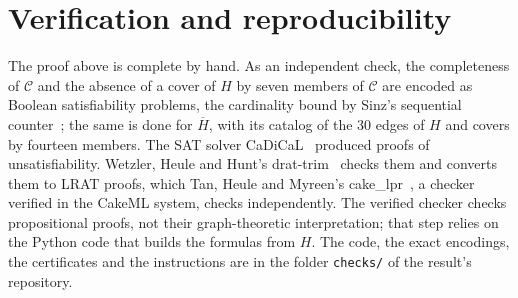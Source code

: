 \documentclass[11pt]{article}
\theoremstyle{remark}
\begin{document}
\section{Verification and reproducibility}
The proof above is complete by hand. As an independent check, the
completeness of $\mathcal C$ and the absence of a cover of $H$ by seven
members of $\mathcal C$ are encoded as Boolean satisfiability problems,
the cardinality bound by Sinz's sequential counter~\cite{sinz}; the
same is done for $\overline H$, with its catalog of the 30 edges of $H$
and covers by fourteen members. The SAT solver CaDiCaL~\cite{cadical}
produced proofs of unsatisfiability. Wetzler, Heule and Hunt's
drat-trim~\cite{drat} checks them and converts them to LRAT proofs,
which Tan, Heule and Myreen's cake\_lpr~\cite{cake}, a checker verified
in the CakeML system, checks independently. The verified checker checks
propositional proofs, not their graph-theoretic interpretation; that
step relies on the Python code that builds the formulas from $H$. The
code, the exact encodings, the certificates and the instructions are in
the folder \texttt{checks/} of the result's repository.
\end{document}
